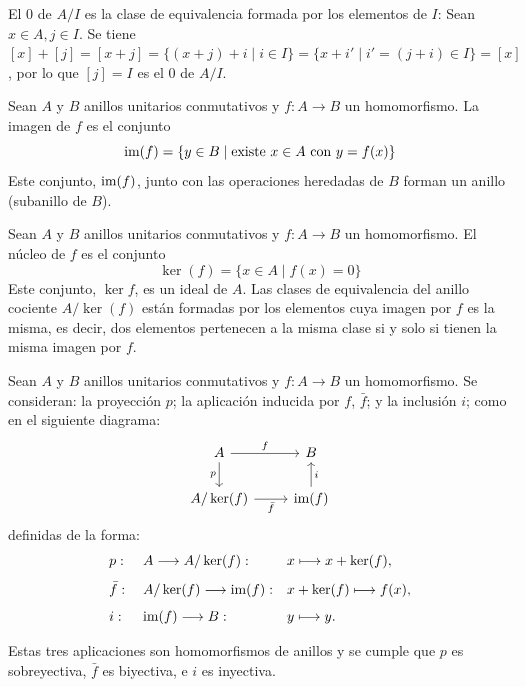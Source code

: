 \begin{obs}
    El 0 de  $A/I$ es la clase de equivalencia formada por los elementos de $I$:
        Sean $x\in A, j\in I$. Se tiene $[x] + [j] = [x + j] = \{(x + j) + i \mid i\in I\} = \{x + i' \mid i' = (j + i)\in I\} = [x]$, por lo que $[j] =  I$ es el 0 de $A/I$.
           
\end{obs}


\begin{deff}{\cite[p.~31]{GamboaAnillos}}
    Sean $A$ y $B$ anillos unitarios conmutativos y $f: A \longrightarrow B$ un homomorfismo. La imagen de $f$ es el conjunto  \[\text{im}(f) = \{y\in B \mid \text{existe }x \in A \text{ con } y = f(x)\}\] Este conjunto, $\text{im}(f)$, junto con las operaciones heredadas de $B$ forman un anillo (subanillo de $B$).
\end{deff}
\begin{deff}{\cite[p.~31]{GamboaAnillos}} \label{definicion:nucleo_homomorfismo}
    Sean $A$ y $B$ anillos unitarios conmutativos y $f: A \longrightarrow B$ un homomorfismo. El núcleo de $f$ es el conjunto  \[\ker(f) = \{x\in A \mid f(x) = 0\}\] Este conjunto, $\ker{f}$, es un ideal de $A$. Las clases de equivalencia del anillo cociente $A/\ker(f)$ están formadas por los elementos cuya imagen por $f$ es la misma, es decir, dos elementos pertenecen a la misma clase si y solo si tienen la misma imagen por $f$.
\end{deff}

\begin{deff}{\cite[p.~32]{GamboaAnillos}\label{teorema_isomorfia}}
    Sean $A$ y $B$ anillos unitarios conmutativos y $f: A \longrightarrow B$ un homomorfismo. Se consideran: la proyección $p$; la aplicación inducida por $f$, $\bar{f}$; y la inclusión $i$; como en el siguiente diagrama:
    \[
        \begin{tikzcd}
        A \arrow[r,"f"] \arrow[d,"p"']
        & B \\
        A/\ker(f) \arrow[r,"\bar{f}"']
        & \im{f} \arrow[u,"i"']
        \end{tikzcd}
    \]
    definidas de la forma:
\begin{align*}
&&& p:        &&\; A \longrightarrow A/\ker(f):         && x \longmapsto x+\ker(f),     &&\\[1ex]
&&& \bar{f}:  &&\; A/\ker(f) \longrightarrow \text{im}(f):    && x+\ker(f) \longmapsto f(x),  &&\\[1ex]
&&& i:        &&\; \text{im}(f) \longrightarrow B:            && y \longmapsto y.             &&
\end{align*}

Estas tres aplicaciones son homomorfismos de anillos y se cumple que $p$ es sobreyectiva, $\bar f$ es biyectiva, e $i$ es inyectiva.     
\end{deff}

